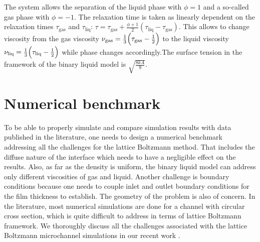 \documentclass{CFD2011}
\begin{document}
The system allows the separation of the liquid
phase with $\phi=1$ and a so-called gas phase with $\phi=-1$. The
relaxation time is taken as linearly dependent on the relaxation
times $\tau_{\mathrm{gas}}$ and $\tau_{\mathrm{liq}}$:
$\tau=\tau_{\mathrm{gas}}+\frac{\phi+1}{2}(\tau_{\mathrm{liq}}-\tau_{\mathrm{gas}})$. This allows
to change viscosity from the gas viscosity
$\nu_{\mathrm{gas}}=\frac{1}{3}\Bigl(\tau_{\mathrm{gas}}-\frac{1}{2}\Bigr)$ to the liquid viscosity
$\nu_{\mathrm{liq}}=\frac{1}{3}\Bigl(\tau_{\mathrm{liq}}-\frac{1}{2}\Bigr)$ while phase changes
accordingly.The surface tension in the framework of the binary liquid model is $\sqrt{\frac{8 k
A}{9}}$.

\section{Numerical benchmark}
To be able to properly simulate and compare simulation results with data
published in the literature, one needs to design a numerical benchmark addressing
all the challenges for the lattice Boltzmann method. That includes the diffuse nature of the
interface which needs to have a negligible effect on the results. Also, as far as the density is
uniform, the binary liquid model can address only different viscosities of gas and liquid.
Another challenge is boundary conditions because one needs to couple inlet and outlet
boundary conditions \cite{heil-threedim} for the film thickness to establish.  The geometry of
the problem is also of concern. In the literature, most numerical simulations are done
for a channel with
circular cross section,
which is quite difficult to address in terms of lattice Boltzmann framework. We thoroughly discuss
all the
challenges associated with the lattice Boltzmann microchannel simulations in our recent work
\cite{kuzmin-binary2d}. 
\end{document}
